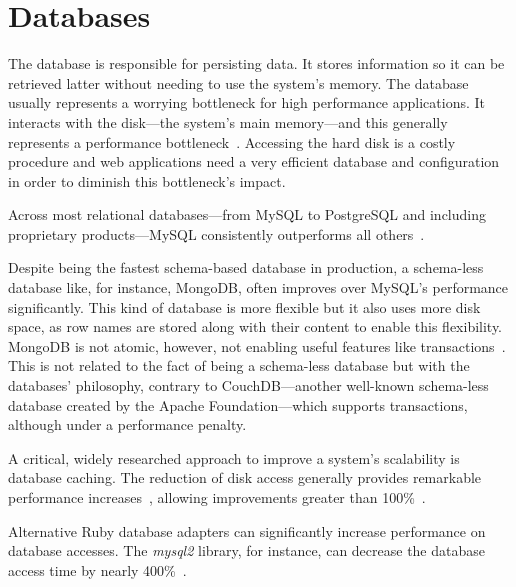 \section{Databases} %
\label{state:sec:databases}
The database is responsible for persisting data. It stores information so it can be retrieved latter without needing to use the system's memory.
The database usually represents a worrying bottleneck for high performance applications. It interacts with the disk---the system's main memory---and this generally represents a performance bottleneck~\cite{memory_wall}. Accessing the hard disk is a costly procedure and web applications need a very efficient database and configuration in order to diminish this bottleneck's impact.

Across most relational databases---from MySQL to PostgreSQL and including proprietary products---MySQL consistently outperforms all others~\cite{benchmark_relational_databases}.

Despite being the fastest schema-based database in production, a schema-less database like, for instance, MongoDB, often improves over MySQL's performance significantly. This kind of database is more flexible but it also uses more disk space, as row names are stored along with their content to enable this flexibility. MongoDB is not atomic, however, not enabling useful features like transactions~\cite{mysql_to_mongodb}. This is not related to the fact of being a schema-less database but with the databases' philosophy, contrary to CouchDB---another well-known schema-less database created by the Apache Foundation---which supports transactions, although under a performance penalty.

A critical, widely researched approach to improve a system's scalability is database caching. The reduction of disk access generally provides remarkable performance increases~\cite{scaling_rails_bottomup}, allowing improvements greater than 100\%~\cite{rapid_prototyping_mdd,high_performance_database_caching}.

Alternative Ruby database adapters can significantly increase performance on database accesses. The \textit{mysql2} library, for instance, can decrease the database access time by nearly 400\%~\cite{brianmario_mysql2}.

